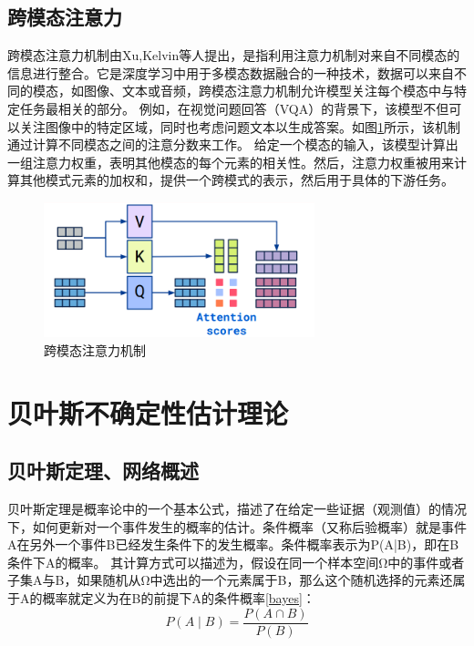 \subsection{跨模态注意力}
跨模态注意力机制由Xu,Kelvin等人\cite{xu2015show}提出，是指利用注意力机制对来自不同模态的信息进行整合。它是深度学习中用于多模态数据融合的一种技术，数据可以来自不同的模态，如图像、文本或音频，跨模态注意力机制允许模型关注每个模态中与特定任务最相关的部分。
例如，在视觉问题回答（VQA）的背景下，该模型不但可以关注图像中的特定区域，同时也考虑问题文本以生成答案。如图\ref{crossatt}所示，该机制通过计算不同模态之间的注意分数来工作。
给定一个模态的输入，该模型计算出一组注意力权重，表明其他模态的每个元素的相关性。然后，注意力权重被用来计算其他模式元素的加权和，提供一个跨模式的表示，然后用于具体的下游任务。
\begin{figure}[htbp]
	\centering	
	\includegraphics[width=0.7\textwidth]{Fig/myfig/chapter2/cross-attention.png}  %
	\caption{\label{crossatt}跨模态注意力机制} 
\end{figure}

\section{贝叶斯不确定性估计理论}
\subsection{贝叶斯定理、网络概述}
贝叶斯定理是概率论中的一个基本公式，描述了在给定一些证据（观测值）的情况下，如何更新对一个事件发生的概率的估计。条件概率（又称后验概率）就是事件A在另外一个事件B已经发生条件下的发生概率。条件概率表示为P(A|B)，即在B条件下A的概率。
其计算方式可以描述为，假设在同一个样本空间Ω中的事件或者子集A与B，如果随机从Ω中选出的一个元素属于B，那么这个随机选择的元素还属于A的概率就定义为在B的前提下A的条件概率\eqref{bayes}：
\begin{equation}
	\label{bayes}
	P(A \mid B)=\frac{P(A \cap B)}{P(B)}
\end{equation}

